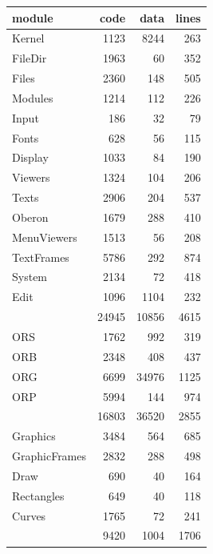 \begin{table}[p]
  \centering
  \begin{tabular}{l r r r}
    module        & code  & data  & lines \\\hline
    Kernel        &  1123 &  8244 &  263  \\
    FileDir       &  1963 &    60 &  352  \\
    Files         &  2360 &   148 &  505  \\
    Modules       &  1214 &   112 &  226  \\
    Input         &   186 &    32 &   79  \\ 
    Fonts         &   628 &    56 &  115  \\
    Display       &  1033 &    84 &  190  \\
    Viewers       &  1324 &   104 &  206  \\
    Texts         &  2906 &   204 &  537  \\
    Oberon        &  1679 &   288 &  410  \\
    MenuViewers   &  1513 &    56 &  208  \\  
    TextFrames    &  5786 &   292 &  874  \\
    System        &  2134 &    72 &  418  \\
    Edit          &  1096 &  1104 &  232  \\\hline
                  & 24945 & 10856 & 4615  \\ [1ex]
    ORS           &  1762 &   992 &  319  \\
    ORB           &  2348 &   408 &  437  \\
    ORG           &  6699 & 34976 & 1125  \\
    ORP           &  5994 &   144 &  974  \\\hline
                  & 16803 & 36520 & 2855  \\ [1ex]
    Graphics      &  3484 &   564 &  685  \\
    GraphicFrames &  2832 &   288 &  498  \\
    Draw          &   690 &    40 &  164  \\
    Rectangles    &   649 &    40 &  118  \\
    Curves        &  1765 &    72 &  241  \\\hline
                  &  9420 &  1004 & 1706  \\
  \end{tabular}
\end{table}

